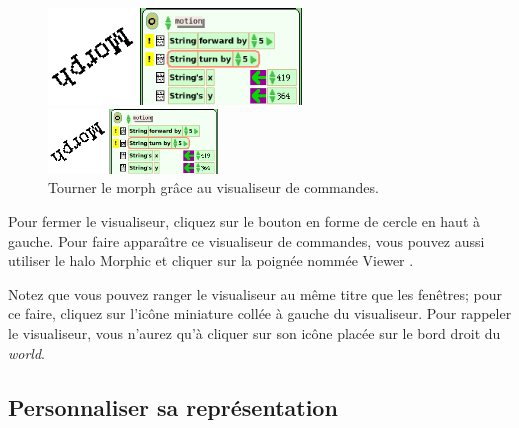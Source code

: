 \documentclass[a4paper,10pt,twoside]{book}
\begin{document}
\begin{figure}[ht]
	\ifluluelse
		{\centerline{\includegraphics[width=0.6\textwidth]{turningInViewer}}}
		{\centerline{\includegraphics[width=0.4\textwidth]{turningInViewer}}}
	\caption{Tourner le morph gr\^ace au visualiseur de commandes.\label{fig:turningInViewer}}
\end{figure}

Pour fermer le visualiseur, cliquez sur le bouton en forme de cercle
en haut \`a gauche. Pour faire appara\^{\i}tre ce visualiseur de
commandes, vous pouvez aussi utiliser le halo Morphic et cliquer sur
la poign\'ee nomm\'ee Viewer \viewerHandle{}.
   
Notez que vous pouvez ranger le visualiseur au m\^eme titre que les
fen\^etres; pour ce faire, cliquez sur l'ic\^one miniature coll\'ee \`a
gauche du visualiseur. Pour rappeler le visualiseur, vous n'aurez
qu'\`a cliquer sur son ic\^one plac\'ee sur le bord droit du \emph{world}.

\subsection{Personnaliser sa repr\'esentation}
\end{document}
